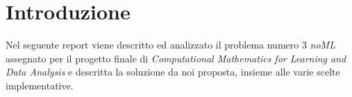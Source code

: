 \section{Introduzione}

Nel seguente report viene descritto ed analizzato il problema numero 3 \emph{noML} assegnato per il progetto finale di \emph{Computational Mathematics for Learning and Data Analysis} e descritta la soluzione da noi proposta, insieme alle varie scelte implementative.
